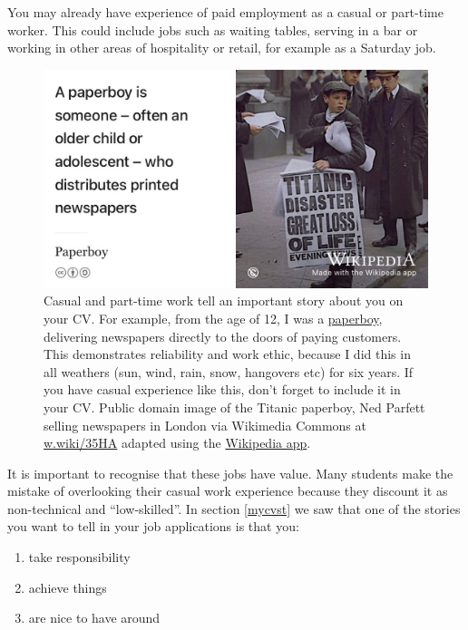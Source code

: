 \documentclass[
]{book}
\providecommand{\tightlist}{%
  \setlength{\itemsep}{0pt}\setlength{\parskip}{0pt}}
\begin{document}
You may already have experience of paid employment as a casual or part-time worker. This could include jobs such as waiting tables, serving in a bar or working in other areas of hospitality or retail, for example as a Saturday job.

\begin{figure}

{\centering \includegraphics[width=0.99\linewidth]{images/Titanic-paperboy-crop} 

}

\caption{Casual and part-time work tell an important story about you on your CV. For example, from the age of 12, I was a \href{https://en.wikipedia.org/wiki/Paperboy}{paperboy}, delivering newspapers directly to the doors of paying customers. This demonstrates reliability and work ethic, because I did this in all weathers (sun, wind, rain, snow, hangovers etc) for six years. If you have casual experience like this, don't forget to include it in your CV. Public domain image of the Titanic paperboy, Ned Parfett selling newspapers in London via Wikimedia Commons at \href{https://w.wiki/35HA}{w.wiki/35HA} adapted using the \href{https://apps.apple.com/us/app/wikipedia/id324715238}{Wikipedia app}.}\label{fig:paperboy-fig}
\end{figure}



It is important to recognise that these jobs have value. Many students make the mistake of overlooking their casual work experience because they discount it as non-technical and ``low-skilled''. In section \ref{mycvst} we saw that one of the stories you want to tell in your job applications is that you:

\begin{enumerate}
\def\labelenumi{\arabic{enumi}.}
\tightlist
\item
  take responsibility
\item
  achieve things
\item
  are nice to have around
\end{enumerate}
\end{document}
